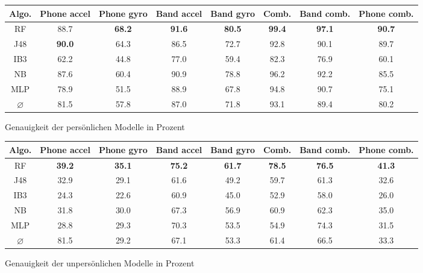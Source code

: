 \begin{figure}
\centering
\begin{tabular}{|c|c|c|c|c|c|c|c|}
	\hline 
	\textbf{Algo.} & \textbf{Phone accel} & \textbf{Phone gyro} & \textbf{Band accel} & \textbf{Band gyro} & \textbf{Comb.} & \textbf{Band comb.} & \textbf{Phone comb.} \\ 
	\hline 
	RF & 88.7 & \textbf{68.2} & \textbf{91.6} & \textbf{80.5} & \textbf{99.4} & \textbf{97.1} & \textbf{90.7} \\ 
	J48 & \textbf{90.0} & 64.3 & 86.5 & 72.7 & 92.8 & 90.1 & 89.7 \\ 
	IB3 & 62.2 & 44.8 & 77.0 & 59.4 & 82.3 & 76.9 & 60.1 \\ 
	NB & 87.6 & 60.4 & 90.9 & 78.8 & 96.2 & 92.2 & 85.5 \\ 
	MLP & 78.9 & 51.5 & 88.9 & 67.8 & 94.8 & 90.7 & 75.1 \\ 
	\hline 
	$\varnothing$ & 81.5 & 57.8 & 87.0 & 71.8 & 93.1 & 89.4 & 80.2 \\ 
	\hline 
\end{tabular}
\caption{Genauigkeit der persönlichen Modelle in Prozent}
\label{fig:accuracy-personal}
\end{figure}

\begin{figure}
\centering
\begin{tabular}{|c|c|c|c|c|c|c|c|}
	\hline 
	\textbf{Algo.} & \textbf{Phone accel} & \textbf{Phone gyro} & \textbf{Band accel} & \textbf{Band gyro} & \textbf{Comb.} & \textbf{Band comb.} & \textbf{Phone comb.} \\ 
	\hline 
	RF & \textbf{39.2} & \textbf{35.1} & \textbf{75.2} & \textbf{61.7} & \textbf{78.5} & \textbf{76.5} & \textbf{41.3} \\ 
	J48 & 32.9 & 29.1 & 61.6 & 49.2 & 59.7 & 61.3 & 32.6 \\ 
	IB3 & 24.3 & 22.6 & 60.9 & 45.0 & 52.9 & 58.0 & 26.0 \\ 
	NB & 31.8 & 30.0 & 67.3 & 56.9 & 60.9 & 62.3 & 35.0 \\ 
	MLP & 28.8 & 29.3 & 70.3 & 53.5 & 54.9 & 74.3 & 31.5 \\ 
	\hline 
	$\varnothing$ & 81.5 & 29.2 & 67.1 & 53.3 & 61.4 & 66.5 & 33.3 \\ 
	\hline 
\end{tabular} 
\caption{Genauigkeit der unpersönlichen Modelle in Prozent}
\label{fig:accuracy-impersonal}
\end{figure}

